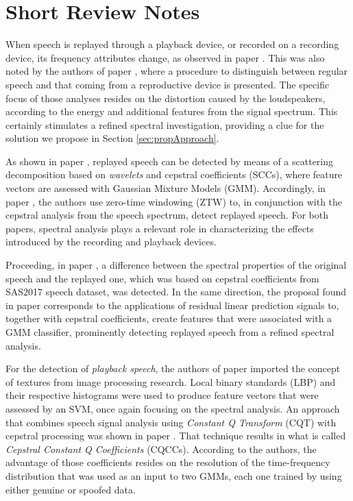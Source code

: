 \section{Short Review Notes}
\label{sec:revBibli}
\par When speech is replayed through a playback device, or recorded on a recording device, its frequency attributes change, as observed in paper \cite{np2}. This was also noted by the authors of paper \cite{Ren2019}, where a procedure to distinguish between regular speech and that coming from a reproductive device is presented. The specific focus of those analyses resides on the distortion caused by the loudspeakers, according to the energy and additional features from the signal spectrum. This certainly stimulates a refined spectral investigation, providing a clue for the solution we propose in Section \ref{sec:propApproach}. 
\\
\par As shown in paper \cite{7802552}, replayed speech can be detected by means of a scattering decomposition based on \textit {wavelets} and cepstral coefficients (SCCs), where feature vectors are assessed with Gaussian Mixture Models (GMM). Accordingly, in paper \cite{alluri2019replay}, the authors use zero-time windowing (ZTW) to, in conjunction with the cepstral analysis from the speech spectrum, detect replayed speech.	For both papers, spectral analysis plays a relevant role in characterizing the effects introduced by the recording and playback devices.
\\
\par Proceeding, in paper \cite{8725688}, a difference between the spectral properties of the original speech and the replayed one, which was based on cepstral coefficients from SAS2017 speech dataset, was detected. In the same direction, the proposal found in paper \cite{Hanilci2018} corresponds to the applications of residual linear prediction signals to, together with cepstral coefficients, create features that were associated with a GMM classifier, prominently detecting replayed speech from a refined spectral analysis.	
\\
\par For the detection of \textit{playback speech}, the authors of paper \cite{ISI:000473343500086} imported the concept of textures from image processing research. Local binary standards (LBP) and their respective histograms were used to produce feature vectors that were assessed by an SVM, once again focusing on the spectral analysis. An approach that combines speech signal analysis using \textit{Constant Q Transform} (CQT) with cepstral processing was shown in paper \cite{TODISCO2017516}. That technique results in what is called \textit{Cepstral Constant Q Coefficients} (CQCCs). According to the authors, the advantage of those coefficients resides on the resolution of the time-frequency distribution that was used as an input to two GMMs, each one trained by using either genuine or spoofed data.
